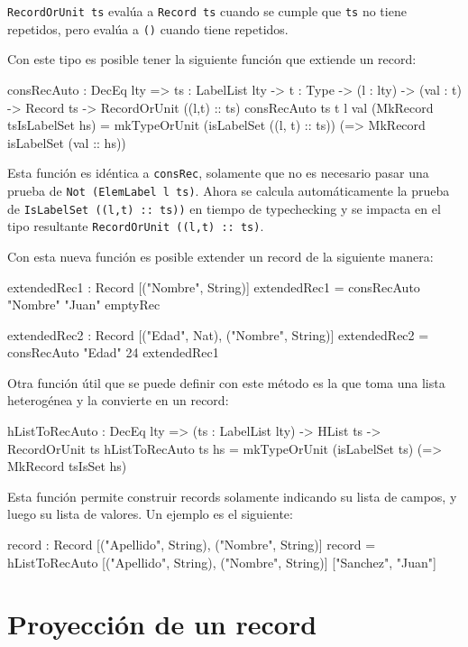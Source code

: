 \begin{code}
\begin{code}
{\texttt{RecordOrUnit ts} evalúa a \texttt{Record ts} cuando se cumple que \texttt{ts} no tiene repetidos, pero evalúa a \texttt{()} cuando tiene repetidos.

Con este tipo es posible tener la siguiente función que extiende un record:

\begin{code}
consRecAuto : DecEq lty => {ts : LabelList lty} -> {t : Type} -> (l : lty) -> (val : t) -> Record ts -> RecordOrUnit ((l,t) :: ts)
consRecAuto {ts} {t} l val (MkRecord tsIsLabelSet hs) = mkTypeOrUnit (isLabelSet ((l, t) :: ts)) (\isLabelSet => MkRecord isLabelSet (val :: hs))
\end{code}

Esta función es idéntica a \texttt{consRec}, solamente que no es necesario pasar una prueba de \texttt{Not (ElemLabel l ts)}. Ahora se calcula automáticamente la prueba de \texttt{IsLabelSet ((l,t) :: ts))}  en tiempo de typechecking y se impacta en el tipo resultante \texttt{RecordOrUnit ((l,t) :: ts)}.

Con esta nueva función es posible extender un record de la siguiente manera:

\begin{code}
extendedRec1 : Record [("Nombre", String)]
extendedRec1 = consRecAuto "Nombre" "Juan" emptyRec

extendedRec2 : Record [("Edad", Nat), ("Nombre", String)]
extendedRec2 = consRecAuto "Edad" 24 extendedRec1
\end{code}

Otra función útil que se puede definir con este método es la que toma una lista heterogénea y la convierte en un record:

\begin{code}
hListToRecAuto : DecEq lty => (ts : LabelList lty) -> HList ts -> RecordOrUnit ts
hListToRecAuto ts hs = mkTypeOrUnit (isLabelSet ts) (\tsIsSet => MkRecord tsIsSet hs) 
\end{code}

Esta función permite construir records solamente indicando su lista de campos, y luego su lista de valores. Un ejemplo es el siguiente:

\begin{code}
record : Record [("Apellido", String), ("Nombre", String)]
record = hListToRecAuto [("Apellido", String), ("Nombre", String)] ["Sanchez", "Juan"]
\end{code}

\section{Proyección de un record}

}
\end{code}
\end{code}
